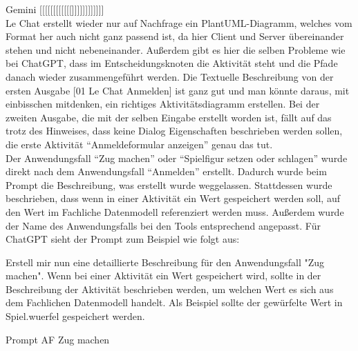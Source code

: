 Gemini [[[[[[[[[[[[]]]]]]]]]]]]\\

Le Chat erstellt wieder nur auf Nachfrage ein PlantUML-Diagramm, welches vom Format her auch nicht ganz passend ist, da hier Client und Server übereinander 
stehen und nicht nebeneinander. Außerdem gibt es hier die selben Probleme wie bei ChatGPT, dass im Entscheidungsknoten die Aktivität steht und die Pfade 
danach wieder zusammengeführt werden. Die Textuelle Beschreibung von der ersten Ausgabe [01 Le Chat Anmelden] ist ganz gut und man könnte daraus, mit 
einbisschen mitdenken, ein richtiges Aktivitätsdiagramm erstellen. Bei der zweiten Ausgabe, die mit der selben Eingabe erstellt worden ist, fällt auf 
das trotz des Hinweises, dass keine Dialog Eigenschaften beschrieben werden sollen, die erste Aktivität ``Anmeldeformular anzeigen'' genau das tut.\\

Der Anwendungsfall ``Zug machen'' oder ``Spielfigur setzen oder schlagen'' wurde direkt nach dem Anwendungsfall ``Anmelden'' erstellt. Dadurch wurde
beim Prompt die Beschreibung, was erstellt wurde weggelassen. Stattdessen wurde beschrieben, dass wenn in einer Aktivität ein Wert gespeichert werden
soll, auf den Wert im Fachliche Datenmodell referenziert werden muss. Außerdem wurde der Name des Anwendungsfalls bei den Tools entsprechend angepasst. 
Für ChatGPT sieht der Prompt zum Beispiel wie folgt aus:

\begin{prompt}[H]
    \begin{tcolorbox}[colback=gray!20, colframe=gray!20, boxrule=0pt, sharp corners] 
        Erstell mir nun eine detaillierte Beschreibung für den Anwendungsfall "Zug machen". Wenn bei einer Aktivität ein Wert gespeichert wird, sollte 
        in der Beschreibung der Aktivität beschrieben werden, um welchen Wert es sich aus dem Fachlichen Datenmodell handelt. Als Beispiel sollte der 
        gewürfelte Wert in Spiel.wuerfel gespeichert werden.
        \vfill
    \end{tcolorbox}
    \caption{Prompt AF Zug machen}
    \label{Prompt AF Zug Machen}
\end{prompt}


